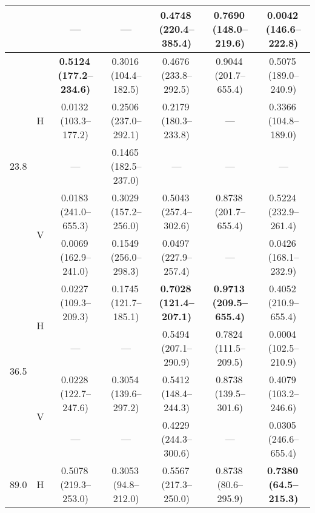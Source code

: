 \documentclass[fleqn,10pt]{wlscirep_mdpi_style}
\begin{document}
\begin{table}[!htbp]
{\begin{tabular}{@{}llccccc@{}}
    &   & ---                   & ---                   & 0.4748\,(220.4--385.4) & 0.7690\,(148.0--219.6) & 0.0042\,(146.6--222.8) \\
\midrule
\multirow{5}{*}{23.8}  
    & \multirow{3}{*}{H} 
        & \textbf{0.5124\,(177.2--234.6)} & 0.3016\,(104.4--182.5) & 0.4676\,(233.8--292.5) & 0.9044\,(201.7--655.4) & 0.5075\,(189.0--240.9) \\
    &   & 0.0132\,(103.3--177.2) & 0.2506\,(237.0--292.1) & 0.2179\,(180.3--233.8) & ---                   & 0.3366\,(104.8--189.0) \\
    &   & ---                   & 0.1465\,(182.5--237.0) & ---                   & ---                   & --- \\[6pt]
    & \multirow{2}{*}{V} 
        & 0.0183\,(241.0--655.3) & 0.3029\,(157.2--256.0) & 0.5043\,(257.4--302.6) & 0.8738\,(201.7--655.4) & 0.5224\,(232.9--261.4) \\
    &   & 0.0069\,(162.9--241.0) & 0.1549\,(256.0--298.3) & 0.0497\,(227.9--257.4) & ---                   & 0.0426\,(168.1--232.9) \\
\midrule
\multirow{4}{*}{36.5}  
    & \multirow{2}{*}{H} 
        & 0.0227\,(109.3--209.3) & 0.1745\,(121.7--185.1) & \textbf{0.7028\,(121.4--207.1)} & \textbf{0.9713\,(209.5--655.4)} & 0.4052\,(210.9--655.4) \\
    &   & ---                   & ---                   & 0.5494\,(207.1--290.9) & 0.7824\,(111.5--209.5) & 0.0004\,(102.5--210.9) \\[6pt]
    & \multirow{2}{*}{V} 
        & 0.0228\,(122.7--247.6) & 0.3054\,(139.6--297.2) & 0.5412\,(148.4--244.3) & 0.8738\,(139.5--301.6) & 0.4079\,(103.2--246.6) \\
    &   & ---                   & ---                   & 0.4229\,(244.3--300.6) & ---                   & 0.0305\,(246.6--655.4) \\
\midrule
\multirow{5}{*}{89.0}  
    & \multirow{3}{*}{H} 
        & 0.5078\,(219.3--253.0) & 0.3053\,(94.8--212.0)  & 0.5567\,(217.3--250.0) & 0.8738\,(80.6--295.9)  & \textbf{0.7380\,(64.5--215.3)}  \\

\end{tabular}}
\end{table}
\end{document}
